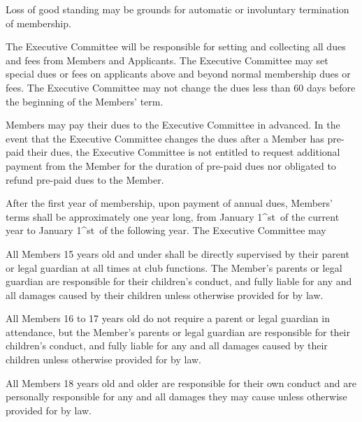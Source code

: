 \documentclass{bylaws}
\begin{document}
Loss of good standing may be grounds for automatic or involuntary termination of membership. 



The Executive Committee will be responsible for setting and collecting all dues and fees from Members and Applicants.  The Executive Committee may set special dues or fees on applicants above and beyond normal membership dues or fees.  The Executive Committee may not change the dues less than 60 days before the beginning of the Members' term.

Members may pay their dues to the Executive Committee in advanced.  In the event that the Executive Committee changes the dues after a Member has pre-paid their dues, the Executive Committee is not entitled to request additional payment from the Member for the duration of pre-paid dues nor obligated to refund pre-paid dues to the Member. 

After the first year of membership, upon payment of annual dues, Members' terms shall be approximately one year long, from January 1^{st}\ of the current year to January 1^{st}\ of the following year.  The Executive Committee may 



All Members 15 years old and under shall be directly supervised by their parent or legal guardian at all times at club functions. The Member's parents or legal guardian are responsible for their children's conduct, and fully liable for any and all damages caused by their children unless otherwise provided for by law. 

All Members 16 to 17 years old do not require a parent or legal guardian in attendance, but the Member's parents or legal guardian are responsible for their children's conduct, and fully liable for any and all damages caused by their children unless otherwise provided for by law.

All Members 18 years old and older are responsible for their own conduct and are personally responsible for any and all damages they may cause unless otherwise provided for by law. 

\end{document}
